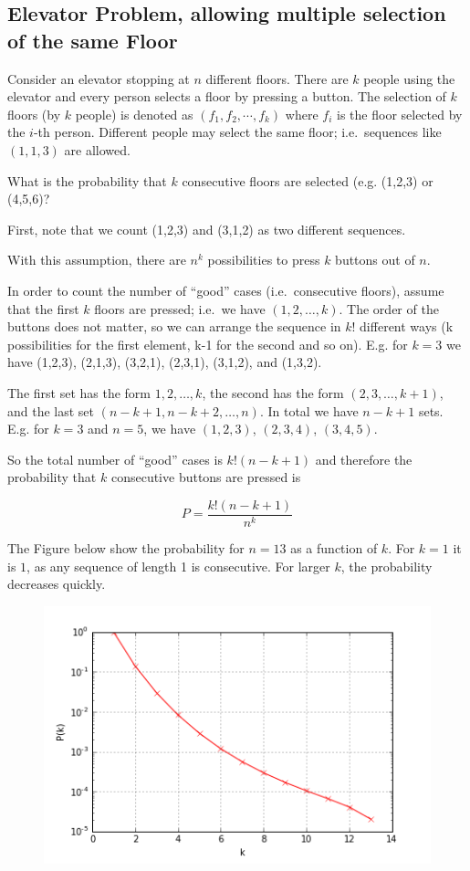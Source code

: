 
\subsection{Elevator Problem, allowing multiple selection of the same
Floor}

Consider an elevator stopping at $n$ different floors. There are $k$ people using the elevator and every person selects a floor by pressing a button. The selection of $k$ floors (by $k$ people) is denoted as $(f_1,f_2,\cdots,f_k) $ where $f_i$ is the floor selected by the $i$-th person. Different people may select the same floor; i.e.~sequences like $(1,1,3)$ are allowed.

What is the probability that $k$ consecutive floors are selected (e.g. (1,2,3) or (4,5,6)?

First, note that we count (1,2,3) and (3,1,2) as two different sequences.

With this assumption, there are $n^k$ possibilities to press $k$ buttons out of $n$.

In order to count the number of ``good'' cases (i.e.~consecutive floors), assume that the first $k$ floors are pressed; i.e.~we have $ (1,2,\ldots,k) $. The order of the buttons does not matter, so we can arrange the sequence in $k!$ different ways (k possibilities for the first element, k-1 for the second and so on). E.g. for $k=3$ we have (1,2,3), (2,1,3), (3,2,1), (2,3,1), (3,1,2), and (1,3,2).

The first set has the form $1,2,\ldots,k$, the second has the form $(2,3,\ldots,k+1)$, and the last set $(n-k+1,n-k+2,\ldots,n)$. In total we have $n-k+1$ sets. E.g. for $k=3$ and $n=5$, we have $(1,2,3)$, $(2,3,4)$, $(3,4,5)$.

So the total number of ``good'' cases is $k!(n-k+1)$ and therefore the probability that $k$ consecutive buttons are pressed is

\[
P = \frac{k!(n-k+1)}{n^k}
\]

The Figure below show the probability for $n=13$ as a function of $k$. For $k=1$ it is $1$, as any sequence of length 1 is consecutive. For larger $k$, the probability decreases quickly.

\begin{figure}[H]
\includegraphics[scale=0.7]{images/elevator.png}
\end{figure}

